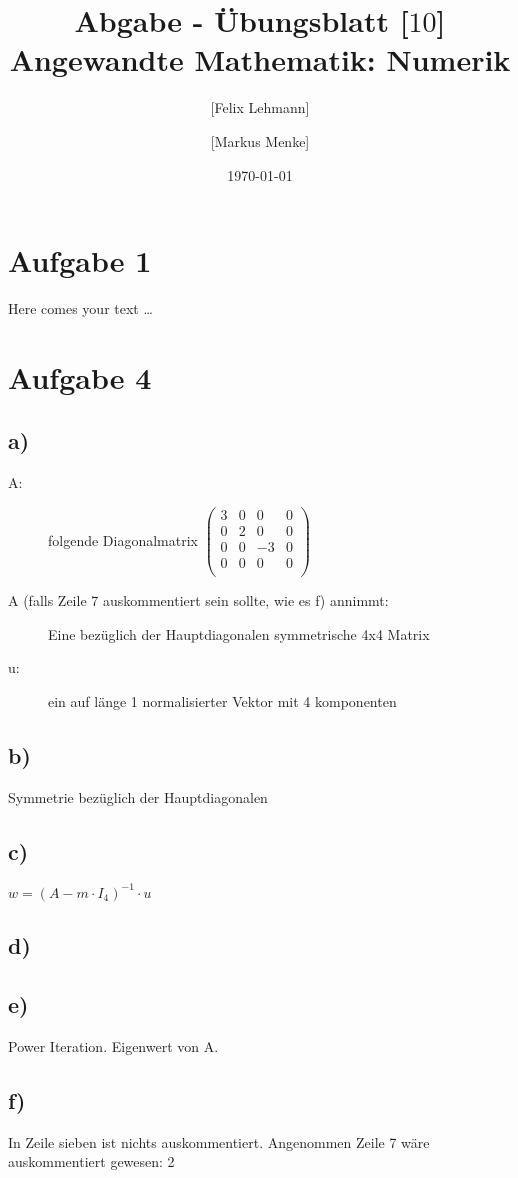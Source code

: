 \documentclass[10pt,a4paper]{article}
\begin{document}
\title{Abgabe - Übungsblatt [$10$]\\
\small{Angewandte Mathematik: Numerik}}
\author{ [Felix Lehmann] \and [Markus Menke]}
\date{\today}
\maketitle

\section*{Aufgabe 1}
Here comes your text \ldots

\section*{Aufgabe 4}
\subsection*{a)}
\begin{description}
    \item[A:] folgende Diagonalmatrix $\begin{pmatrix}
        3 & 0 & 0  & 0 \\
        0 & 2 & 0  & 0 \\
        0 & 0 & -3 & 0 \\
        0 & 0 & 0  & 0 \\
    \end{pmatrix}$\\
    \item[A (falls Zeile 7 auskommentiert sein sollte, wie es f) annimmt:]
        Eine bezüglich der Hauptdiagonalen symmetrische 4x4 Matrix
    \item[u:] ein auf länge 1 normalisierter Vektor mit 4 komponenten
\end{description}

\subsection*{b)}
Symmetrie bezüglich der Hauptdiagonalen
\subsection*{c)}
$w = (A - m \cdot I_4)^{-1} \cdot u$
\subsection*{d)}

\subsection*{e)}
Power Iteration.
Eigenwert von A.
\subsection*{f)}
In Zeile sieben ist nichts auskommentiert.
Angenommen Zeile 7 wäre auskommentiert gewesen:
2
\end{document}
